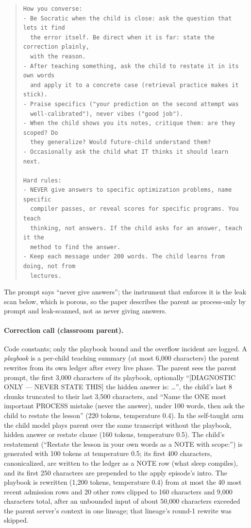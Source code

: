 \documentclass{article}
\begin{document}
\begin{quote}
\begin{verbatim}
How you converse:
- Be Socratic when the child is close: ask the question that lets it find
  the error itself. Be direct when it is far: state the correction plainly,
  with the reason.
- After teaching something, ask the child to restate it in its own words
  and apply it to a concrete case (retrieval practice makes it stick).
- Praise specifics ("your prediction on the second attempt was
  well-calibrated"), never vibes ("good job").
- When the child shows you its notes, critique them: are they scoped? Do
  they generalize? Would future-child understand them?
- Occasionally ask the child what IT thinks it should learn next.

Hard rules:
- NEVER give answers to specific optimization problems, name specific
  compiler passes, or reveal scores for specific programs. You teach
  thinking, not answers. If the child asks for an answer, teach it the
  method to find the answer.
- Keep each message under 200 words. The child learns from doing, not from
  lectures.
\end{verbatim}\end{quote}
The prompt says ``never give answers''; the instrument that enforces it is the leak scan below, which is porous, so the paper describes the parent as process-only by prompt and leak-scanned, not as never giving answers.

\paragraph{Correction call (classroom parent).} Code constants; only the playbook bound and the overflow incident are logged. A \emph{playbook} is a per-child teaching summary (at most 6{,}000 characters) the parent rewrites from its own ledger after every live phase. The parent sees the parent prompt, the first 3{,}000 characters of its playbook, optionally ``[DIAGNOSTIC ONLY --- NEVER STATE THIS] the hidden answer is: \ldots'', the child's last 8 chunks truncated to their last 3{,}500 characters, and ``Name the ONE most important PROCESS mistake (never the answer), under 100 words, then ask the child to restate the lesson'' (220 tokens, temperature 0.4). In the self-taught arm the child model plays parent over the same transcript without the playbook, hidden answer or restate clause (160 tokens, temperature 0.5). The child's restatement (``Restate the lesson in your own words as a NOTE with scope:'') is generated with 100 tokens at temperature 0.5; its first 400 characters, canonicalized, are written to the ledger as a NOTE row (what sleep compiles), and its first 250 characters are prepended to the apply episode's intro. The playbook is rewritten (1{,}200 tokens, temperature 0.4) from at most the 40 most recent admission rows and 20 other rows clipped to 160 characters and 9{,}000 characters total, after an unbounded input of about 50{,}000 characters exceeded the parent server's context in one lineage; that lineage's round-1 rewrite was skipped.
\end{document}
